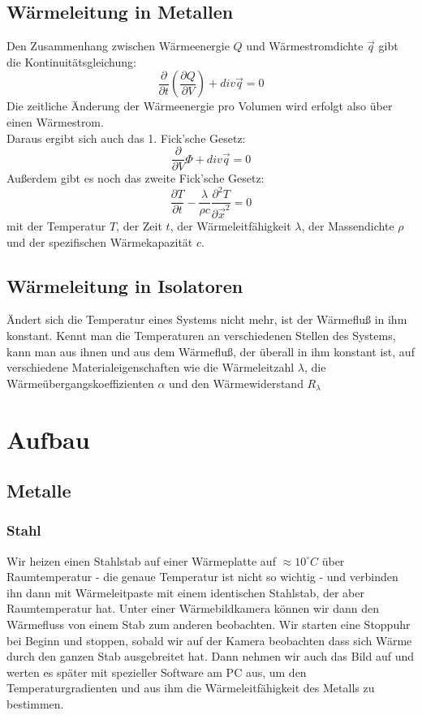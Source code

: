 \documentclass[12pt,a4paper,twopage]{article}
\begin{document}
\subsection{Wärmeleitung in Metallen}
Den Zusammenhang zwischen Wärmeenergie $Q$ und Wärmestromdichte $\vec{q}$ gibt die Kontinuitätsgleichung:
$$\frac{\partial}{\partial t}\left(\frac{\partial Q}{\partial V}\right) + div \vec{q}=0$$
Die zeitliche Änderung der Wärmeenergie pro Volumen wird erfolgt also über einen Wärmestrom.\\
Daraus ergibt sich auch das 1. Fick'sche Gesetz:
$$\frac{\partial}{\partial V}\Phi + div \vec{q}=0$$
Außerdem gibt es noch das zweite Fick'sche Gesetz:
$$\frac{\partial T}{\partial t}-\frac{\lambda}{\rho c	}\frac{\partial^2 T}{\partial \vec{x}^2}=0$$
mit der Temperatur $T$, der Zeit $t$, der Wärmeleitfähigkeit $\lambda$, der Massendichte $\rho$ und der spezifischen Wärmekapazität $c$.

\subsection{Wärmeleitung in Isolatoren}
Ändert sich die Temperatur eines Systems nicht mehr, ist der Wärmefluß in ihm konstant. Kennt man die Temperaturen an verschiedenen Stellen des Systems, kann man aus ihnen und aus dem Wärmefluß, der überall in ihm konstant ist, auf verschiedene Materialeigenschaften wie die Wärmeleitzahl $\lambda$, die Wärmeübergangskoeffizienten $\alpha$ und den Wärmewiderstand $R_\lambda$


\section{Aufbau}
\subsection{Metalle}
\subsubsection*{Stahl}
Wir heizen einen Stahlstab auf einer Wärmeplatte auf $\approx 10^\circ C$ über Raumtemperatur - die genaue Temperatur ist nicht so wichtig - und verbinden ihn dann mit Wärmeleitpaste mit einem identischen Stahlstab, der aber Raumtemperatur hat. Unter einer Wärmebildkamera können wir dann den Wärmefluss von einem Stab zum anderen beobachten. Wir starten eine Stoppuhr bei Beginn und stoppen, sobald wir auf der Kamera beobachten dass sich Wärme durch den ganzen Stab ausgebreitet hat. Dann nehmen wir auch das Bild auf und werten es später mit spezieller Software am PC aus, um den Temperaturgradienten und aus ihm die Wärmeleitfähigkeit des Metalls zu bestimmen.
\end{document}

